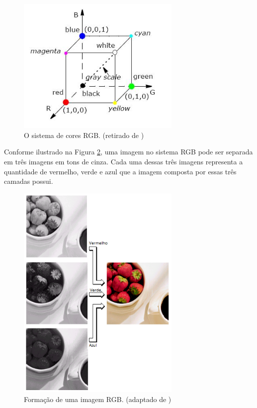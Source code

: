 \documentclass[	12pt, Times, openright, twoside, a4paper, english, brazil]{abntex2}
\begin{document}
\begin{figure}[!htb]
\centering \includegraphics[width=0.7\textwidth]{figuraRGB.png}
\caption{O sistema de cores RGB. (retirado de ) \label{fig:figuraRGB}}
\end{figure}

Conforme ilustrado na Figura \ref{fig:figuraFormacaoImagemRGB}, uma imagem no sistema RGB pode ser separada em três imagens em tons de cinza. Cada uma dessas três imagens representa a quantidade de vermelho, verde e azul que a imagem composta por essas três camadas possui.

\begin{figure}[!htb]
\centering \includegraphics[width=0.7\textwidth]{figuraFormacaoImagemRGB.png}
\caption{Formação de uma imagem RGB. (adaptado de ) \label{fig:figuraFormacaoImagemRGB}}
\end{figure}
\end{document}
